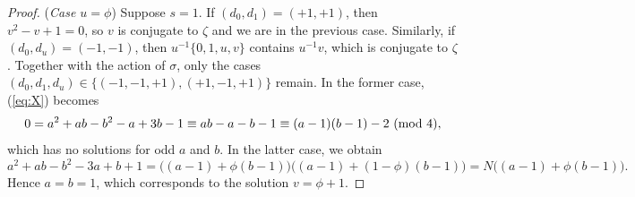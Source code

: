 \documentclass{amsart}
\theoremstyle{plain}
\newtheorem{proposition}[theorem]{Proposition}
\theoremstyle{definition}
\newcommand{\mapsfrom}{\mathrel{\reflectbox{\ensuremath{\mapsto}}}}
\newcommand{\Z}{\ensuremath{\mathbb{Z}}}
\newcommand{\clq}{C}
\begin{document}
\begin{proof}
	(\emph{Case \(u=\phi\)}) Suppose \(s=1\). If \((d_0,d_1)=(+1,+1)\), then \(v^2-v+1=0\), so \(v\) is conjugate to \(\zeta\) and we are in the previous case. Similarly, if \((d_0,d_u)=(-1,-1)\), then \(u^{-1}\{0,1,u,v\}\) contains \(u^{-1}v\), which is conjugate to \(\zeta\). Together with the action of \(\sigma\), only the cases \((d_0,d_1,d_u)\in\{(-1,-1,+1),(+1,-1,+1)\}\) remain.
	In the former case, (\ref{eq:X}) becomes
	\[0 = a^2+ab-b^2-a+3b-1 \equiv ab-a-b-1 \equiv (a-1)(b-1)-2 \ (\textup{mod }4),\]
	which has no solutions for odd \(a\) and \(b\). In the latter case, we obtain
	\[a^2+ab-b^2-3a+b+1 = \big((a-1)+\phi (b-1)\big)\big((a-1)+(1-\phi)(b-1)\big)=N\big((a-1)+\phi(b-1)\big).\]
	Hence \(a=b=1\), which corresponds to the solution \(v=\phi+1\).
\end{proof}

\end{document}
